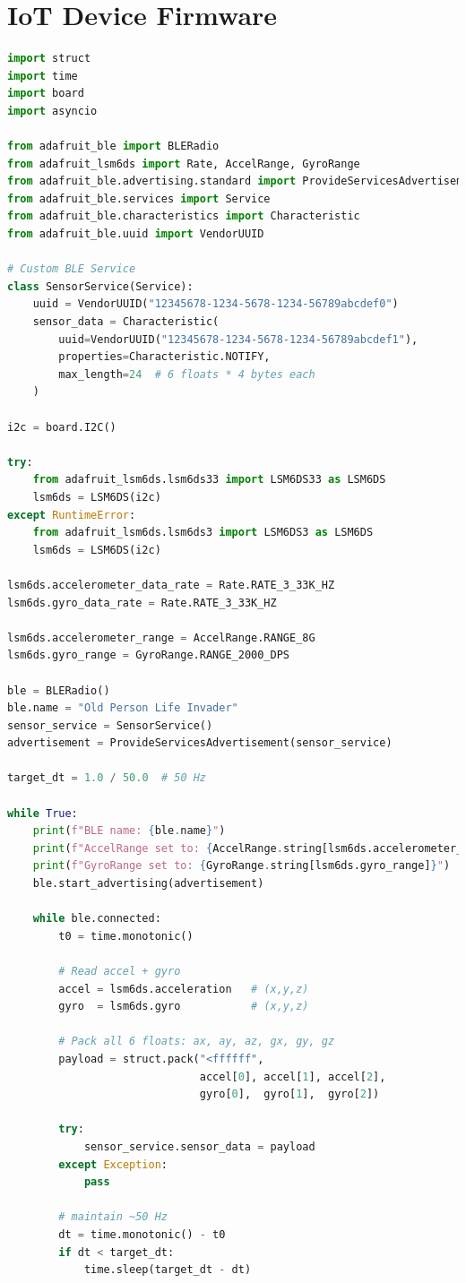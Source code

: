 \documentclass[conference]{IEEEtran}
\begin{document}
\section{IoT Device Firmware}\label{iot_firmware}
\begin{lstlisting}[language=Python]
import struct
import time
import board
import asyncio

from adafruit_ble import BLERadio
from adafruit_lsm6ds import Rate, AccelRange, GyroRange
from adafruit_ble.advertising.standard import ProvideServicesAdvertisement
from adafruit_ble.services import Service
from adafruit_ble.characteristics import Characteristic
from adafruit_ble.uuid import VendorUUID

# Custom BLE Service
class SensorService(Service):
    uuid = VendorUUID("12345678-1234-5678-1234-56789abcdef0")
    sensor_data = Characteristic(
        uuid=VendorUUID("12345678-1234-5678-1234-56789abcdef1"),
        properties=Characteristic.NOTIFY,
        max_length=24  # 6 floats * 4 bytes each
    )

i2c = board.I2C()

try:
    from adafruit_lsm6ds.lsm6ds33 import LSM6DS33 as LSM6DS
    lsm6ds = LSM6DS(i2c)
except RuntimeError:
    from adafruit_lsm6ds.lsm6ds3 import LSM6DS3 as LSM6DS
    lsm6ds = LSM6DS(i2c)

lsm6ds.accelerometer_data_rate = Rate.RATE_3_33K_HZ
lsm6ds.gyro_data_rate = Rate.RATE_3_33K_HZ

lsm6ds.accelerometer_range = AccelRange.RANGE_8G
lsm6ds.gyro_range = GyroRange.RANGE_2000_DPS

ble = BLERadio()
ble.name = "Old Person Life Invader"
sensor_service = SensorService()
advertisement = ProvideServicesAdvertisement(sensor_service)

target_dt = 1.0 / 50.0  # 50 Hz

while True:
    print(f"BLE name: {ble.name}")
    print(f"AccelRange set to: {AccelRange.string[lsm6ds.accelerometer_range]}")
    print(f"GyroRange set to: {GyroRange.string[lsm6ds.gyro_range]}")
    ble.start_advertising(advertisement)

    while ble.connected:
        t0 = time.monotonic()

        # Read accel + gyro
        accel = lsm6ds.acceleration   # (x,y,z)
        gyro  = lsm6ds.gyro           # (x,y,z)

        # Pack all 6 floats: ax, ay, az, gx, gy, gz
        payload = struct.pack("<ffffff",
                              accel[0], accel[1], accel[2],
                              gyro[0],  gyro[1],  gyro[2])

        try:
            sensor_service.sensor_data = payload
        except Exception:
            pass

        # maintain ~50 Hz
        dt = time.monotonic() - t0
        if dt < target_dt:
            time.sleep(target_dt - dt)
\end{lstlisting}
\end{document}
